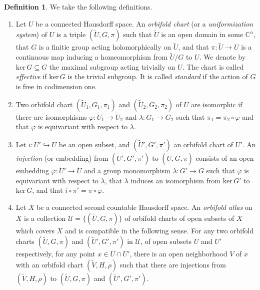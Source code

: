 \documentclass[12pt]{amsart}
\newcommand{\<}{\leq}
\theoremstyle{remark}
\theoremstyle{definition}
\newtheorem{definition}[theorem]{Definition}
\theoremstyle{definition}
\numberwithin{equation}{section}
\theoremstyle{definition}
\theoremstyle{definition}
\begin{document}
\begin{definition}\label{def:orbifold}
We take the following definitions.
\begin{enumerate}
    \item Let $U$ be a connected Hausdorff space. An \textit{orbifold chart} (or a \textit{uniformization system}) of $U$ is a triple $(\widetilde{U}, G, \pi)$ such that $\widetilde{U}$ is an  open domain  in some $\mathbb{C}^n$, that $G$ is a finitie group acting holomorphically on $\widetilde{U}$, and that $\pi\colon \widetilde{U}\to U$ is a continuous map inducing a homeomorphism from $\widetilde{U}/G$ to $U$.  
    We  denote by $\mathrm{ker}\, G \subseteq G$ the maximal subgroup acting trivially on $U$.  The chart is called \textit{effective} if $\mathrm{ker}\, G $ is the trivial  subgroup.  
    It is called \textit{standard} if  the action of $G$ is free in codimension one.



    \item Two orbifold chart $(\widetilde{U}_1,G_1,\pi_1)$ and $(\widetilde{U}_2,G_2,\pi_2)$  of $U$ are isomorphic if there are isomorphisms $\varphi \colon \widetilde{U}_1 \to \widetilde{U}_2$ and $\lambda \colon G_1 \to G_2$ such that $\pi_1 = \pi_2 \circ \varphi$ and that $\varphi$ is equivariant with respect to $\lambda$.

    \item Let $i\colon U' \hookrightarrow  U$ be an open subset, and $(\widetilde{U}',G',\pi')$ an orbifold chart of $U'$. 
          An \textit{injection} (or embedding) from $(\widetilde{U}',G',\pi')$ to  $(\widetilde{U}, G, \pi)$ consists of an open embedding $\varphi \colon \widetilde{U}'\to \widetilde{U}$ and a group monomorphism $\lambda \colon G'\to G$ such that $\varphi$ is equivariant with respect to $\lambda$,  that $\lambda$ induces an isomorphism from  $\mathrm{ker}\, G' $ to $\mathrm{ker}\, G$, and that $i\circ \pi' = \pi\circ \varphi$.  

    \item Let $X$ be a connected second countable Hausdorff space. An \textit{ orbifold atlas} on $X$ is a collection $\mathcal{U} = \{(\widetilde{U},G,\pi)\}$ of orbifold charts of open subsets of $X$ which covers $X$ and is compatible in the following sense. 
    For any two  orbifold charts $(\widetilde{U},G,\pi)$ and $(\widetilde{U}',G',\pi')$ in $\mathcal{U}$,  
    of open subsets $U$ and $U'$ respectively, for any point $x\in U\cap U'$, there is an open neighborhood $V$ of $x$ with an orbifold chart  $(\widetilde{V},H,\rho)$ such that there are injections from $(\widetilde{V},H,\rho)$ to  $(\widetilde{U},G,\pi)$ and  $(\widetilde{U}',G',\pi')$.


\end{enumerate}
\end{definition}
\end{document}
